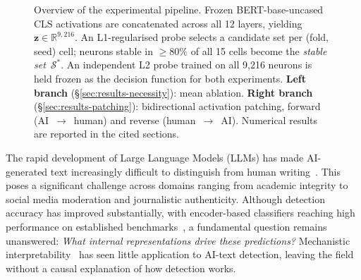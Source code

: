 \documentclass[11pt]{article}
\newcommand{\bertbase}{BERT-base-uncased\xspace}
\begin{document}
\begin{figure}[!t]
{%
}
\caption{Overview of the experimental pipeline. Frozen \bertbase CLS activations are concatenated across all 12 layers, yielding $\mathbf{z}\in\mathbb{R}^{9{,}216}$. An L1-regularised probe selects a candidate set per (fold, seed) cell; neurons stable in ${\geq}80\%$ of all 15 cells become the \textit{stable set}~$\mathcal{S}^{*}$. An independent L2 probe trained on all 9{,}216 neurons is held frozen as the decision function for both experiments. \textbf{Left branch} (\S\ref{sec:results-necessity}): mean ablation. \textbf{Right branch} (\S\ref{sec:results-patching}): bidirectional activation patching, forward (AI~$\to$~human) and reverse (human~$\to$~AI). Numerical results are reported in the cited sections.}
\label{fig:pipeline}
\end{figure}

The rapid development of Large Language Models (LLMs) has made AI-generated text increasingly difficult to distinguish from human writing~\cite{dugan2024raid}. This poses a significant challenge across domains ranging from academic integrity to social media moderation and journalistic authenticity. Although detection accuracy has improved substantially, with encoder-based classifiers reaching high performance on established benchmarks~\cite{dugan2024raid}, a fundamental question remains unanswered: \textit{What internal representations drive these predictions?} Mechanistic interpretability~\citep{elhage2021framework,bereska2024mechanistic} has seen little application to AI-text detection, leaving the field without a causal explanation of how detection works.
\end{document}
